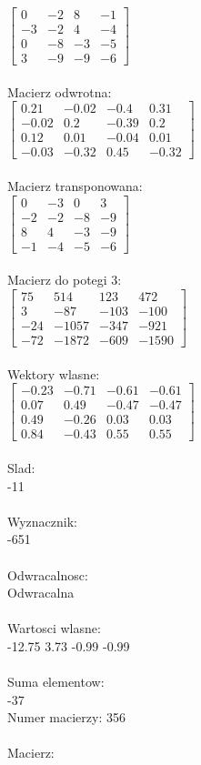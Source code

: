\documentclass[a4paper,12pt]{article}
\begin{document}
$\begin{bmatrix} 0&-2&8&-1\\-3&-2&4&-4\\0&-8&-3&-5\\3&-9&-9&-6 \end{bmatrix}$
\\
\\
Macierz odwrotna:\\

$\begin{bmatrix} 0.21&-0.02&-0.4&0.31\\-0.02&0.2&-0.39&0.2\\0.12&0.01&-0.04&0.01\\-0.03&-0.32&0.45&-0.32 \end{bmatrix}$
\\
\\
Macierz transponowana:\\

$\begin{bmatrix} 0&-3&0&3\\-2&-2&-8&-9\\8&4&-3&-9\\-1&-4&-5&-6 \end{bmatrix}$
\\
\\
Macierz do potegi 3:\\

$\begin{bmatrix} 75&514&123&472\\3&-87&-103&-100\\-24&-1057&-347&-921\\-72&-1872&-609&-1590 \end{bmatrix}$
\\
\\
Wektory wlasne:\\

$\begin{bmatrix} -0.23&-0.71&-0.61&-0.61\\0.07&0.49&-0.47&-0.47\\0.49&-0.26&0.03&0.03\\0.84&-0.43&0.55&0.55 \end{bmatrix}$
\\
\\
Slad:\\
-11
\\
\\
Wyznacznik:\\
-651
\\
\\
Odwracalnosc:\\
Odwracalna
\\
\\
Wartosci wlasne:\\
-12.75 3.73 -0.99 -0.99
\\
\\
Suma elementow:\\
-37
\\
\newpage
Numer macierzy:
356
\\
\\
Macierz:\\
\end{document}
